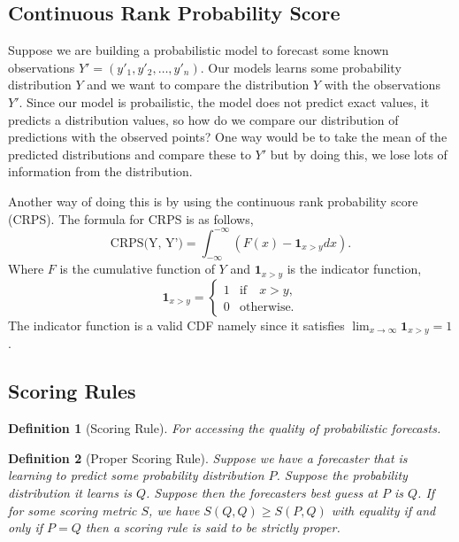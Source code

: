 \documentclass{article}
\newtheorem{definition}{Definition}[section]
\begin{document}
\subsection{Continuous Rank Probability Score}

Suppose we are building a probabilistic model to forecast some known observations $Y' = (y'_1, y'_2, \dots, y'_n)$. Our models learns some probability distribution $Y$ and we want to compare the distribution $Y$ with the observations $Y'$. Since our model is probailistic, the model does not predict exact values, it predicts a distribution values, so how do we compare our distribution of predictions with the observed points? One way would be to take the mean of the predicted distributions and compare these to $Y'$ but by doing this, we lose lots of information from the distribution.

Another way of doing this is by using the continuous rank probability score (CRPS). The formula for CRPS is as follows,
\begin{equation}
    \text{CRPS(Y, Y')} =
    \int_{-\infty}^{-\infty} (F(x) - \mathbf{1}_{x>y} dx).
\end{equation}
Where $F$ is the cumulative function of $Y$ and $\mathbf{1}_{x>y}$ is the indicator function,
\begin{equation}
    \mathbf{1}_{x > y} =
    \begin{cases}
        1 & \text{if} \quad x > y, \\
        0 & \text{otherwise.}
    \end{cases}
\end{equation}
The indicator function is a valid CDF namely since it satisfies $\lim_{x \rightarrow \infty} \mathbf{1}_{x > y} = 1$.

\subsection{Scoring Rules}

\begin{definition}[Scoring Rule]
    For accessing the quality of probabilistic forecasts.
\end{definition}

\begin{definition}[Proper Scoring Rule]
    Suppose we have a forecaster that is learning to predict some probability distribution $P$. Suppose the probability distribution it learns is $Q$. Suppose then the forecasters best guess at $P$ is $Q$. If for some scoring metric $S$, we have $S(Q, Q) \geq S(P, Q)$ with equality if and only if $P = Q$ then a scoring rule is said to be \textit{strictly proper}.
\end{definition}
\end{document}

